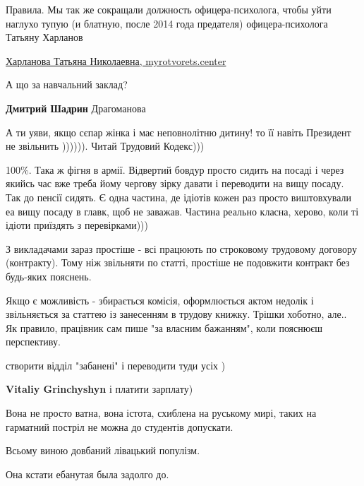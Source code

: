 \begin{itemize}
Правила. Мы так же сокращали должность офицера-психолога, чтобы уйти наглухо
тупую (и блатную, после 2014 года предателя) офицера-психолога Татьяну Харланов

\href{https://myrotvorets.center/criminal/xarlanova-tatyana-nikolaevna}{%
Харланова Татьяна Николаевна, myrotvorets.center%
}

А що за навчальний заклад?

\begin{itemize} %
\textbf{Дмитрий Шадрин} Драгоманова
\end{itemize} %

А ти уяви, якщо сєпар жінка і має неповнолітню дитину! то її навіть Президент не звільнить )))))). Читай Трудовий Кодекс)))


100\%. Така ж фігня в армії. Відвертий бовдур просто сидить на посаді і через
якийсь час вже треба йому чергову зірку давати і переводити на вищу посаду. Так
до пенсії сидять. Є одна частина, де ідіотів кожен раз просто виштовхували еа
вищу посаду в главк, щоб не заважав. Частина реально класна, херово, коли ті
ідіоти приїздять з перевірками)))



З викладачами зараз простіше - всі працюють по строковому трудовому договору
(контракту). Тому ніж звільняти по статті, простіше не подовжити контракт без
будь-яких пояснень.



Якщо є можливість - збирається комісія, оформлюється актом недолік і
звільняється за статтею із занесенням в трудову книжку. Трішки хоботно, але..
Як правило, працівник сам пише "за власним бажанням", коли пояснюєш
перспективу.


створити відділ "забанені" і переводити туди усіх )

\begin{itemize} %
\textbf{Vitaliy Grinchyshyn} і платити зарплату)
\end{itemize} %

Вона не просто ватна, вона істота, схиблена на руському мирі, таких на гарматний постріл не можна до студентів допускати.

Всьому виною довбаний лівацький популізм.

Она кстати ебанутая была задолго до.


\end{itemize}
